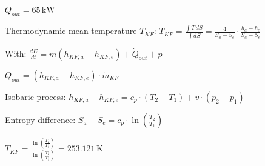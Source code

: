 \( \dot{Q}_{out} = 65 \, \text{kW} \)  

Thermodynamic mean temperature \( T_{KF} \):  
\( T_{KF} = \frac{\int T \, dS}{\int dS} = \frac{4}{S_a - S_e} \cdot \frac{h_a - h_e}{S_a - S_e} \)  

With:  
\( \frac{dE}{dt} = m (h_{KF,a} - h_{KF,e}) + \dot{Q}_{out} + p \)  

\( \dot{Q}_{out} = (h_{KF,a} - h_{KF,e}) \cdot \dot{m}_{KF} \)  

Isobaric process:  
\( h_{KF,a} - h_{KF,e} = c_p \cdot (T_2 - T_1) + v \cdot (p_2 - p_1) \)  

Entropy difference:  
\( S_a - S_e = c_p \cdot \ln \left( \frac{T_2}{T_1} \right) \)  

\( T_{KF} = \frac{\ln \left( \frac{T_2}{T_1} \right)}{\ln \left( \frac{T_2}{T_1} \right)} = 253.121 \, \text{K} \)